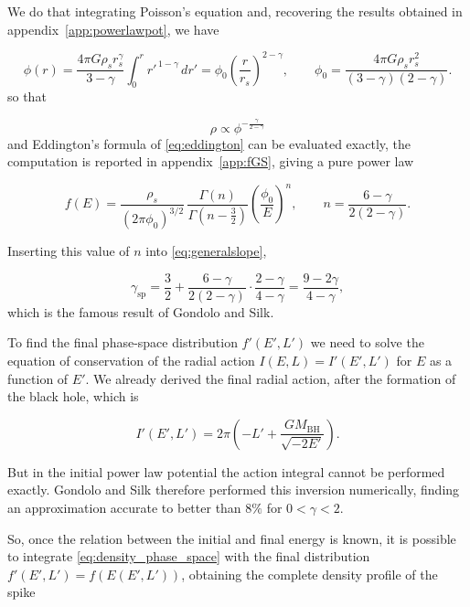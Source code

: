 We do that integrating Poisson's equation and, recovering the results obtained in appendix~\ref{app:powerlawpot}, 
we have


\begin{equation}
\phi(r) = \frac{4\pi G \rho_s r_s^{\gamma}}{3-\gamma}\int_0^r r'^{\,1-\gamma}\, dr'
= \phi_0 \left( \frac{r}{r_s} \right)^{2-\gamma},
\qquad
\phi_0 = \frac{4\pi G \rho_s r_s^{2}}{(3-\gamma)(2-\gamma)} .
\end{equation}
so that

\begin{equation}
    \rho \propto \phi^{-\frac{\gamma}{2-\gamma}}
\end{equation}
and Eddington's formula of
\cref{eq:eddington} can be evaluated exactly, the computation is reported in
appendix~\ref{app:fGS}, giving a pure power law

\begin{equation} \label{eq:fGS}
f(E)
=
\frac{\rho_s}{(2\pi\phi_0)^{3/2}}\,
\frac{\Gamma(n)}{\Gamma\!\left(n-\tfrac{3}{2}\right)}
\left( \frac{\phi_0}{E} \right)^{\! n},
\qquad
n = \frac{6-\gamma}{2(2-\gamma)}.
\end{equation}

Inserting this value of $n$ into \cref{eq:generalslope},

\begin{equation}
\gamma_{\mathrm{sp}}
=
\frac{3}{2} + \frac{6-\gamma}{2(2-\gamma)} \cdot \frac{2-\gamma}{4-\gamma}
=
\frac{9-2\gamma}{4-\gamma},
\end{equation}
which is the famous result of Gondolo and Silk.


To find the final phase-space distribution $f'(E',L')$ we need to solve the equation 
of conservation of the radial action $I(E,L) = I'(E',L')$ for $E$ as a function of $E'$.
We already derived the final radial action, after the formation of the black hole, which is

\begin{equation}
I'(E',L') = 2\pi \left( -L' + \frac{GM_{\mathrm{BH}}}{\sqrt{-2E'}} \right).
\end{equation}

But in the initial power law potential the action integral cannot be performed exactly.
Gondolo and Silk therefore performed this inversion numerically, 
finding an approximation accurate to better than $8\%$ for $0<\gamma<2$.

So, once the relation between the initial and final energy is known, it is possible to integrate
\cref{eq:density_phase_space} with the final distribution $f'(E',L') = f\!\left(E(E',L')\right)$,
obtaining the complete density profile of the spike

